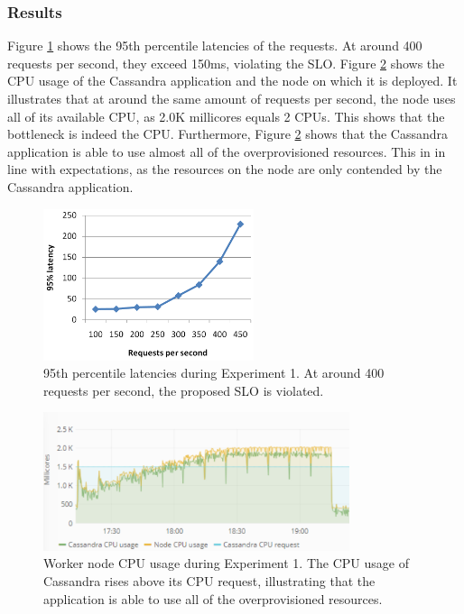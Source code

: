 \subsubsection{Results}
Figure \ref{fig:lat-cas-li} shows the 95th percentile latencies of the requests. At around 400 requests per second, they exceed 150ms, violating the SLO. Figure \ref{fig:cpu-cas-li} shows the CPU usage of the Cassandra application and the node on which it is deployed. It illustrates that at around the same amount of requests per second, the node uses all of its available CPU, as 2.0K millicores equals 2 CPUs. This shows that the bottleneck is indeed the CPU. Furthermore, Figure \ref{fig:cpu-cas-li} shows that the Cassandra application is able to use almost all of the overprovisioned resources. This in in line with expectations, as the resources on the node are only contended by the Cassandra application.

\setlength\abovecaptionskip{3pt}
\begin{figure}[h]
\centering
\includegraphics[width=0.55\textwidth]{Images/Experiments/CPU/Latencies/cas-li.PNG}
\caption{95th percentile latencies during Experiment 1. At around 400 requests per second, the proposed SLO is violated.}
\label{fig:lat-cas-li} 
\end{figure}

\setlength\abovecaptionskip{3pt}
\begin{figure}[h]
\centering
\includegraphics[width=0.80\textwidth]{Images/Experiments/CPU/Grafana/cpu-cas-li.PNG}
\caption{Worker node CPU usage during Experiment 1. The CPU usage of Cassandra rises above its CPU request, illustrating that the application is able to use all of the overprovisioned resources.}
\label{fig:cpu-cas-li} 
\end{figure}

